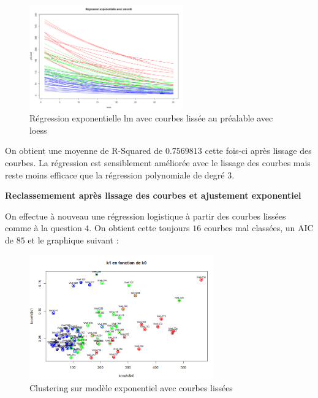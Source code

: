 \documentclass[12pt]{article}
\begin{document}
\begin{figure}[H]
 \centering %
	\includegraphics[width=250px]{reg_exp_smooth_loess}
  \caption{\label{fig:reg_exp_smooth_loess} R\'egression exponentielle lm avec courbes liss\'ee au pr\'ealable avec loess}
\end{figure}

On obtient une moyenne de R-Squared de $0.7569813$ cette fois-ci apr\`es lissage des courbes. La r\'egression est sensiblement am\'elior\'ee avec le lissage des courbes mais reste moins efficace que la r\'egression polynomiale de degr\'e 3.

\newpage

\textbf{Reclassemement apr\`es lissage des courbes et ajustement exponentiel}

On effectue à nouveau une r\'egression logistique à partir des courbes liss\'ees comme à la question $4$.
On obtient cette toujours $16$ courbes mal class\'ees, un AIC de $85$ et le graphique suivant : 

\begin{figure}[H]
 \centering %
	\includegraphics[width=300px]{smooth_clustering_exp}
  \caption{\label{fig:reg_exp_clust} Clustering sur mod\`ele exponentiel avec courbes liss\'ees}
\end{figure}
\end{document}
